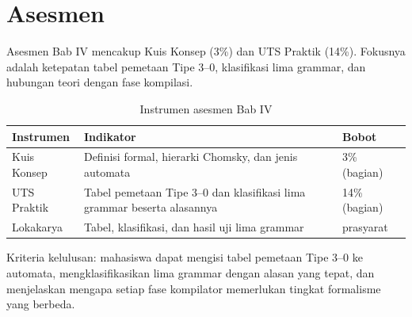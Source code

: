 \section*{Asesmen}

Asesmen Bab IV mencakup Kuis Konsep (3\%) dan UTS Praktik (14\%).
Fokusnya adalah ketepatan tabel pemetaan Tipe 3--0, klasifikasi lima
grammar, dan hubungan teori dengan fase kompilasi.

\begin{table}[H]
\centering
\caption{Instrumen asesmen Bab IV}
\label{tab:ch04-asesmen}
\begin{tabularx}{\textwidth}{@{}lXl@{}}
\toprule
\textbf{Instrumen} & \textbf{Indikator} & \textbf{Bobot} \\
\midrule
Kuis Konsep & Definisi formal, hierarki Chomsky, dan jenis automata &
3\% (bagian) \\
UTS Praktik & Tabel pemetaan Tipe 3--0 dan klasifikasi lima grammar
beserta alasannya & 14\% (bagian) \\
Lokakarya & Tabel, klasifikasi, dan hasil uji lima grammar &
prasyarat \\
\bottomrule
\end{tabularx}
\end{table}

Kriteria kelulusan: mahasiswa dapat mengisi tabel pemetaan Tipe 3--0
ke automata, mengklasifikasikan lima grammar dengan alasan yang tepat,
dan menjelaskan mengapa setiap fase kompilator memerlukan tingkat
formalisme yang berbeda.
